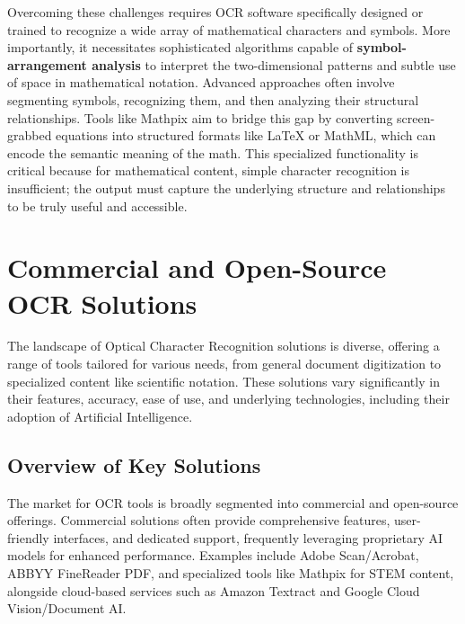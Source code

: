 Overcoming these challenges requires OCR software specifically designed or trained to recognize a wide array of mathematical characters and symbols. More importantly, it necessitates sophisticated algorithms capable of \textbf{symbol-arrangement analysis} to interpret the two-dimensional patterns and subtle use of space in mathematical notation. Advanced approaches often involve segmenting symbols, recognizing them, and then analyzing their structural relationships. Tools like Mathpix aim to bridge this gap by converting screen-grabbed equations into structured formats like LaTeX or MathML, which can encode the semantic meaning of the math. This specialized functionality is critical because for mathematical content, simple character recognition is insufficient; the output must capture the underlying structure and relationships to be truly useful and accessible.

\section{Commercial and Open-Source OCR Solutions}
\label{sec:ocr-solutions}

The landscape of Optical Character Recognition solutions is diverse, offering a range of tools tailored for various needs, from general document digitization to specialized content like scientific notation. These solutions vary significantly in their features, accuracy, ease of use, and underlying technologies, including their adoption of Artificial Intelligence.

\subsection{Overview of Key Solutions}

The market for OCR tools is broadly segmented into commercial and open-source offerings. Commercial solutions often provide comprehensive features, user-friendly interfaces, and dedicated support, frequently leveraging proprietary AI models for enhanced performance. Examples include Adobe Scan/Acrobat, ABBYY FineReader PDF, and specialized tools like Mathpix for STEM content, alongside cloud-based services such as Amazon Textract and Google Cloud Vision/Document AI.

